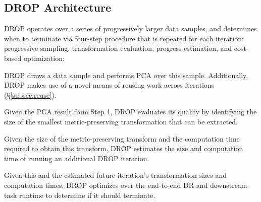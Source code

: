 \subsection{DROP Architecture}
\label{subsec:arch}
DROP operates over a series of progressively larger data samples, and determines when to terminate via  four-step procedure that is repeated for each iteration: progressive sampling, transformation evaluation, progress estimation, and cost-based optimization:




\noindent DROP draws a data sample and performs PCA over this sample. Additionally, DROP makes use of a novel means of reusing work across iterations (\S\ref{subsec:reuse}).


\noindent Given the PCA result from Step 1, DROP evaluates its quality by identifying the size of the smallest metric-preserving transformation that can be extracted. 


\noindent Given the size of the metric-preserving transform and the computation time required to obtain this transform, DROP estimates the size and computation time of running an additional DROP iteration.


\noindent Given this and the estimated future iteration's transformation sizes and computation times, DROP optimizes over the end-to-end DR and downstream task runtime to determine if it should terminate.

